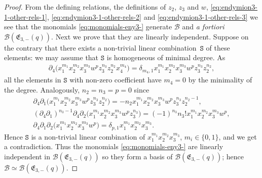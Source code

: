 \documentclass[10pt,a4paper]{amsart}
\numberwithin{equation}{section}
\newcommand{\toba}{\mathscr B}
\newcommand{\eny}{\mathfrak{E}}
\begin{document}
\begin{proof}
From the defining relations, the definitions of $z_2$, $z_3$ and $w$,
\eqref{eq:endymion3-1-other-rels-1}, \eqref{eq:endymion3-1-other-rels-2} and \eqref{eq:endymion3-1-other-rels-3}
we see that the monomials \eqref{eq:monomials-eny3-}
generate $\toba$ and \emph{a fortiori} $\toba(\eny_{3,-}(q))$.
Next we prove that they are linearly independent. Suppose on the contrary that there exists a non-trivial linear combination~$\mathtt{S}$ of these elements: we may assume that $\mathtt{S}$ is homogeneous of minimal degree. As
\begin{align*}
\partial_4 \big( x_1^{m_1} x_2^{m_2} x_3^{m_3} w^{p} z_{3}^{n_3}z_2^{n_2} x_4^{m_4} \big) = \delta_{m_4,1} x_1^{m_1} x_2^{m_2} x_3^{m_3} w^{p} z_{3}^{n_3}z_2^{n_2},
\end{align*}
all the elements in $\mathtt{S}$ with non-zero coefficient have $m_{4}=0$ by the minimality of the degree. Analogously, $n_2=n_3=p=0$ since
\begin{gather*}
\partial_4\partial_1 \big( x_1^{m_1} x_2^{m_2} x_3^{m_3} w^{p} z_{3}^{n_3}z_2^{n_2}\big) = -n_2 x_1^{m_1} x_2^{m_2} x_3^{m_3} w^{p} z_{3}^{n_3}z_2^{n_2-1},
\\[1mm]
(\partial_4\partial_1)^{n_3-1} \partial_4\partial_2 \big( x_1^{m_1} x_2^{m_2} x_3^{m_3} w^{p} z_{3}^{n_3}\big) = (-1)^{n_3}n_3! x_1^{m_1} x_2^{m_2} x_3^{m_3} w^{p},
\\[1mm]
\partial_4\partial_1\partial_2 \big( x_1^{m_1} x_2^{m_2} x_3^{m_3} w^{p}\big) = \delta_{p,1} x_1^{m_1} x_2^{m_2} x_3^{m_3}.
\end{gather*}
Hence $\mathtt{S}$ is a non-trivial linear combination of $x_1^{m_1} x_2^{m_2} x_3^{m_3}$, $m_i\in\{0,1\}$, and we get a contradiction. Thus the monomials \eqref{eq:monomials-eny3-} are linearly independent in $\toba(\eny_{3,-}(q))$
so they form a basis of $\toba(\eny_{3,-}(q))$; hence $\toba \simeq \toba(\eny_{3,-}(q))$.
\end{proof}
\end{document}
